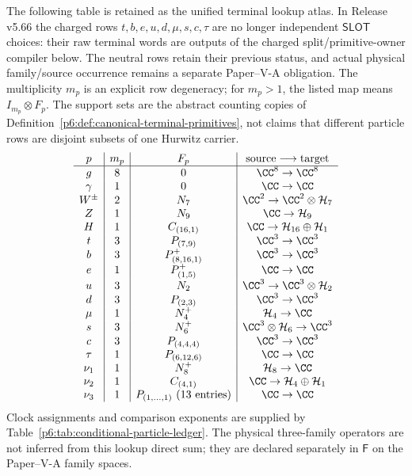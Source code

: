 \documentclass[12pt,a4paper]{article}
\begin{document}
\begin{definition}
\label{p6:def:selected-typed-rows}
The following table is retained as the unified terminal lookup atlas.  In
Release v5.66 the charged rows \(t,b,e,u,d,\mu,s,c,\tau\) are no longer
independent \(\mathsf{SLOT}\) choices: their raw terminal words are outputs of
the charged split/primitive-owner compiler below.  The neutral rows retain
their previous status, and actual physical family/source occurrence remains a
separate Paper--V-A obligation.
The multiplicity \(m_p\) is an explicit row degeneracy; for \(m_p>1\), the
listed map means \(I_{m_p}\otimes F_p\).  The support sets are the abstract
counting copies of
Definition~\ref{p6:def:canonical-terminal-primitives}, not claims that
different particle rows are disjoint subsets of one Hurwitz carrier.
\[
\begin{array}{c|c|c|c}
p&m_p&F_p&\text{source}\longrightarrow\text{target}\\
\hline
g&8&0&\CC^8\to\CC^8\\
\gamma&1&0&\CC\to\CC\\
W^\pm&2&N_7&\CC^2\to\CC^2\otimes\mathcal H_7\\
Z&1&N_9&\CC\to\mathcal H_9\\
H&1&C_{(16,1)}&\CC\to\mathcal H_{16}\oplus\mathcal H_1\\
t&3&P_{(7,9)}&\CC^3\to\CC^3\\
b&3&P_{(8,16,1)}^+&\CC^3\to\CC^3\\
e&1&P_{(1,5)}^+&\CC\to\CC\\
u&3&N_2&\CC^3\to\CC^3\otimes\mathcal H_2\\
d&3&P_{(2,3)}&\CC^3\to\CC^3\\
\mu&1&N_4^+&\mathcal H_4\to\CC\\
s&3&N_6^+&\CC^3\otimes\mathcal H_6\to\CC^3\\
c&3&P_{(4,4,4)}&\CC^3\to\CC^3\\
\tau&1&P_{(6,12,6)}&\CC\to\CC\\
\nu_1&1&N_8^+&\mathcal H_8\to\CC\\
\nu_2&1&C_{(4,1)}&\CC\to\mathcal H_4\oplus\mathcal H_1\\
\nu_3&1&P_{(1,\ldots,1)}\ (13\text{ entries})&\CC\to\CC
\end{array}
\]
Clock assignments and comparison exponents are supplied by
Table~\ref{p6:tab:conditional-particle-ledger}.  The physical
three-family operators are not inferred from this lookup direct sum; they
are declared separately in \(\mathsf F\) on the Paper--V-A family spaces.
\end{definition}
\end{document}
